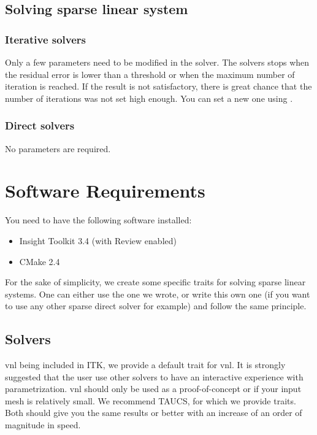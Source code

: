 \documentclass{InsightArticle}
\begin{document}
\subsection{Solving sparse linear system}

\subsubsection{Iterative solvers}
Only a few parameters need to be modified in the solver. The solvers stops when the residual error is lower than a threshold or when the maximum number of iteration is reached. If the result is not satisfactory, there is great chance that the number of iterations was not set high enough. You can set a new one using .

\subsubsection{Direct solvers}
No parameters are required.

\section{Software Requirements}

You need to have the following software installed:

\begin{itemize}
  \item  Insight Toolkit 3.4 (with Review enabled)
  \item  CMake 2.4
\end{itemize}

For the sake of simplicity, we create some specific traits for solving sparse linear systems. One can either use the one we wrote, or write this own one (if you want to use any other sparse direct solver for example) and follow the same principle.

\subsection{Solvers}

vnl being included in ITK, we provide a default trait for vnl. It is strongly suggested that the user use other solvers to have an interactive experience with parametrization. vnl should only be used as a proof-of-concept or if your input mesh is relatively small. We recommend TAUCS, for which we provide traits. Both should give you the same results or better with an increase of an order of magnitude in speed.
\end{document}
